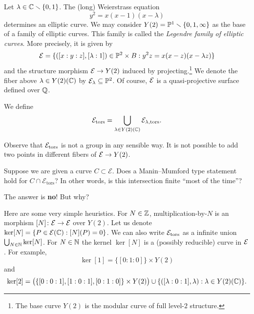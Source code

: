 \begin{example}
  \label{ex:relmm}
  Let $\lambda\in {\mathbb{C}}\smallsetminus\{0,1\}$. The (long) Weierstrass equation
  \begin{equation*}
    y^2 = x(x-1)(x-\lambda)
  \end{equation*}
  determines an elliptic curve. We may consider
  $Y(2) = {\mathbb{P}}^1\smallsetminus\{0,1,\infty\}$ as the base of a family of elliptic
  curves. This family is called the \emph{Legendre family of elliptic
  curves}. More precisely, it is given by
  \begin{equation*}
    {\mathcal E}=\{([x:y:z], [\lambda:1]) \in {\mathbb{P}}^2 \times B : y^2z =
    x(x-z)(x-\lambda z)\}
  \end{equation*}
  and the structure morphism ${\mathcal E}\rightarrow Y(2)$ induced by
  projecting.\footnote{The base curve $Y(2)$ is the modular curve of full level-$2$
  structure.} 
  We denote the fiber above $\lambda\in Y(2)({\mathbb{C}})$  by ${\mathcal E}_\lambda
  \subseteq{\mathbb{P}}^2$.
  Of course, ${\mathcal E}$ is a quasi-projective surface defined over ${\mathbb{Q}}$.
  
  We define
  \begin{equation*}
    {\mathcal E}_{\mathrm{tors}} = \bigcup_{\lambda\in Y(2)({\mathbb{C}})}
    {\mathcal E}_{\lambda,\mathrm{tors}}. 
  \end{equation*}

  Observe that ${\mathcal E}_{\mathrm{tors}}$ is not a group in any sensible
  way. It is not possible to add two points in different fibers of
  ${\mathcal E}\rightarrow Y(2)$.
  
  Suppose we are given a curve $C\subset \mathcal{E}$. Does a
  Manin--Mumford type statement hold for $C\cap
  \mathcal{E}_{\mathrm{tors}}$? In other words, is this intersection
  finite ``most of the time''?

  The answer is \textbf{no}! But why?

  Here are some very simple  heuristics. For $N\in{\mathbb{Z}}$,  multiplication-by-$N$ is an
  morphism
  $[N]\colon {\mathcal E}\rightarrow{\mathcal E}$ over $Y(2)$.
  Let us denote $\ker [N] = \{P \in {\mathcal E}({\mathbb{C}}): [N](P)=0\}$. 
  We can also write
  ${\mathcal E}_{\mathrm{tors}}$ as a infinite union
  $\bigcup_{N\in{\mathbb{N}}}\ker[N]$.
  For $N\in{\mathbb{N}}$ the kernel  $\ker[N]$ is a (possibly reducible) curve
  in ${\mathcal E}$. For example,
  \begin{equation*}
    \ker [1] = \{[0:1:0]\}\times Y(2)
  \end{equation*}
  and
  \begin{equation*}
    \ker[2] = \bigl(\{[0:0:1],[1:0:1],[0:1:0]\}\times Y(2)\bigr)\cup
    \{([\lambda:0:1],\lambda) : \lambda \in Y(2)({\mathbb{C}})\}. 
  \end{equation*}


\end{example}
